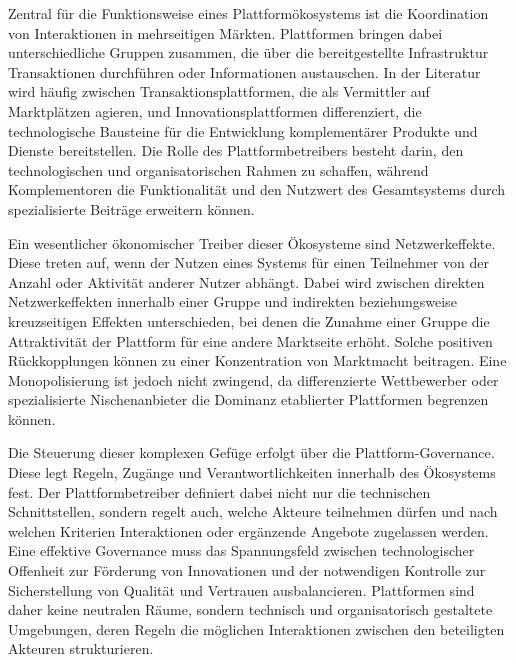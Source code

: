 Zentral für die Funktionsweise eines Plattformökosystems ist die Koordination von Interaktionen in mehrseitigen Märkten. Plattformen bringen dabei unterschiedliche Gruppen zusammen, die über die bereitgestellte Infrastruktur Transaktionen durchführen oder Informationen austauschen. In der Literatur wird häufig zwischen Transaktionsplattformen, die als Vermittler auf Marktplätzen agieren, und Innovationsplattformen differenziert, die technologische Bausteine für die Entwicklung komplementärer Produkte und Dienste bereitstellen. Die Rolle des Plattformbetreibers besteht darin, den technologischen und organisatorischen Rahmen zu schaffen, während Komplementoren die Funktionalität und den Nutzwert des Gesamtsystems durch spezialisierte Beiträge erweitern können.

Ein wesentlicher ökonomischer Treiber dieser Ökosysteme sind Netzwerkeffekte. Diese treten auf, wenn der Nutzen eines Systems für einen Teilnehmer von der Anzahl oder Aktivität anderer Nutzer abhängt. Dabei wird zwischen direkten Netzwerkeffekten innerhalb einer Gruppe und indirekten beziehungsweise kreuzseitigen Effekten unterschieden, bei denen die Zunahme einer Gruppe die Attraktivität der Plattform für eine andere Marktseite erhöht. Solche positiven Rückkopplungen können zu einer Konzentration von Marktmacht beitragen. Eine Monopolisierung ist jedoch nicht zwingend, da differenzierte Wettbewerber oder spezialisierte Nischenanbieter die Dominanz etablierter Plattformen begrenzen können.

Die Steuerung dieser komplexen Gefüge erfolgt über die Plattform-Governance. Diese legt Regeln, Zugänge und Verantwortlichkeiten innerhalb des Ökosystems fest. Der Plattformbetreiber definiert dabei nicht nur die technischen Schnittstellen, sondern regelt auch, welche Akteure teilnehmen dürfen und nach welchen Kriterien Interaktionen oder ergänzende Angebote zugelassen werden. Eine effektive Governance muss das Spannungsfeld zwischen technologischer Offenheit zur Förderung von Innovationen und der notwendigen Kontrolle zur Sicherstellung von Qualität und Vertrauen ausbalancieren. Plattformen sind daher keine neutralen Räume, sondern technisch und organisatorisch gestaltete Umgebungen, deren Regeln die möglichen Interaktionen zwischen den beteiligten Akteuren strukturieren.

